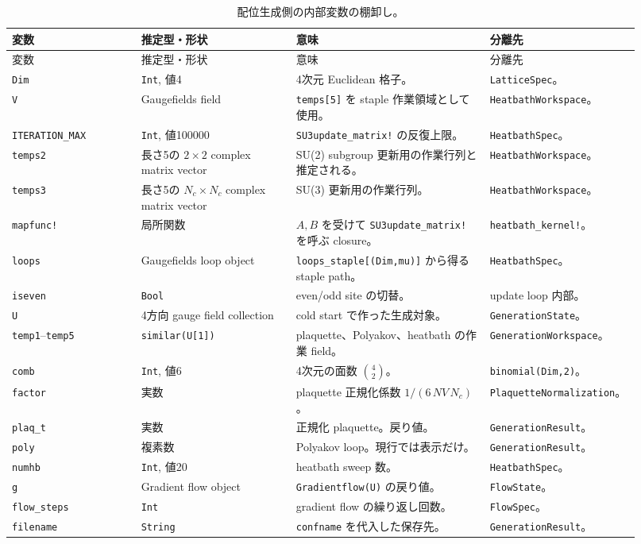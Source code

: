 \documentclass[uplatex,dvipdfmx,ja=standard,11pt,a4paper]{bxjsarticle}
\newcommand{\code}[1]{\texttt{#1}}
\begin{document}
{\small
\begin{longtable}{p{0.20\linewidth}p{0.24\linewidth}p{0.30\linewidth}p{0.18\linewidth}}
\caption{配位生成側の内部変数の棚卸し。}\label{tab:generation-vars}\\
\toprule
変数 & 推定型・形状 & 意味 & 分離先 \\
\midrule
\endfirsthead
\toprule
変数 & 推定型・形状 & 意味 & 分離先 \\
\midrule
\endhead
\code{Dim} & \code{Int}, 値4 & 4次元 Euclidean 格子。 & \code{LatticeSpec}。 \\
\code{V} & Gaugefields field & \code{temps[5]} を staple 作業領域として使用。 & \code{HeatbathWorkspace}。 \\
\code{ITERATION\_MAX} & \code{Int}, 値100000 & \code{SU3update\_matrix!} の反復上限。 & \code{HeatbathSpec}。 \\
\code{temps2} & 長さ5の \(2\times2\) complex matrix vector & SU(2) subgroup 更新用の作業行列と推定される。 & \code{HeatbathWorkspace}。 \\
\code{temps3} & 長さ5の \(N_c\times N_c\) complex matrix vector & SU(3) 更新用の作業行列。 & \code{HeatbathWorkspace}。 \\
\code{mapfunc!} & 局所関数 & \(A,B\) を受けて \code{SU3update\_matrix!} を呼ぶ closure。 & \code{heatbath\_kernel!}。 \\
\code{loops} & Gaugefields loop object & \code{loops\_staple[(Dim,mu)]} から得る staple path。 & \code{HeatbathSpec}。 \\
\code{iseven} & \code{Bool} & even/odd site の切替。 & update loop 内部。 \\
\code{U} & 4方向 gauge field collection & cold start で作った生成対象。 & \code{GenerationState}。 \\
\code{temp1}--\code{temp5} & \code{similar(U[1])} & plaquette、Polyakov、heatbath の作業 field。 & \code{GenerationWorkspace}。 \\
\code{comb} & \code{Int}, 値6 & 4次元の面数 \(\binom{4}{2}\)。 & \code{binomial(Dim,2)}。 \\
\code{factor} & 実数 & plaquette 正規化係数 \(1/(6\,NV\,N_c)\)。 & \code{PlaquetteNormalization}。 \\
\code{plaq\_t} & 実数 & 正規化 plaquette。戻り値。 & \code{GenerationResult}。 \\
\code{poly} & 複素数 & Polyakov loop。現行では表示だけ。 & \code{GenerationResult}。 \\
\code{numhb} & \code{Int}, 値20 & heatbath sweep 数。 & \code{HeatbathSpec}。 \\
\code{g} & Gradient flow object & \code{Gradientflow(U)} の戻り値。 & \code{FlowState}。 \\
\code{flow\_steps} & \code{Int} & gradient flow の繰り返し回数。 & \code{FlowSpec}。 \\
\code{filename} & \code{String} & \code{confname} を代入した保存先。 & \code{GenerationResult}。 \\
\bottomrule
\end{longtable}
}
\end{document}
